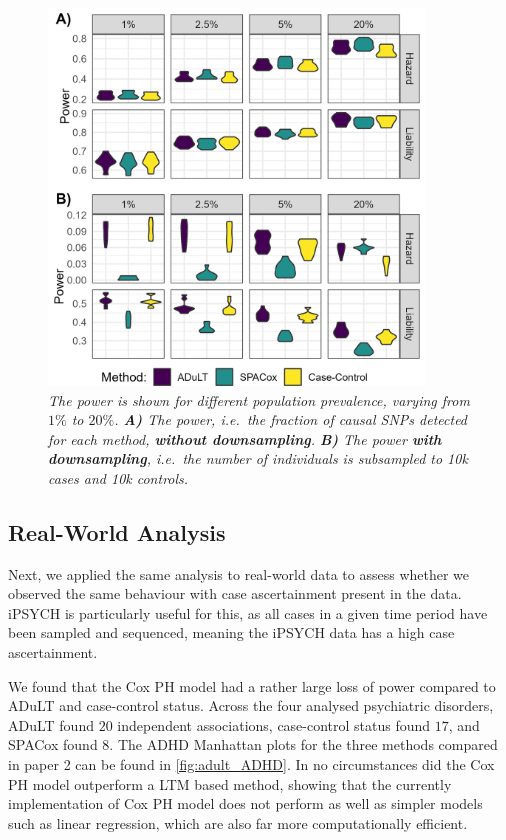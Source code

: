 \begin{figure}[h]
	\centering
	\includegraphics[width=10cm]{results/adult_combined_C250_power}
	\caption[Power simulation results with $ 250 $ causal SNPs under both generative models and varying prevalences.]{\sl The power is shown for different population prevalence, varying from $ 1\% $ to $ 20\% $. \textbf{A)} The power, i.e.\ the fraction of causal SNPs detected for each method, \textbf{without downsampling}. \textbf{B)} The power \textbf{with downsampling}, i.e.\ the number of individuals is subsampled to 10k cases and 10k controls.}
	\label{fig:adult_simulations}
\end{figure}


\subsection{Real-World Analysis}
Next, we applied the same analysis to real-world data to assess whether we observed the same behaviour with case ascertainment present in the data. iPSYCH is particularly useful for this, as all cases in a given time period have been sampled and sequenced, meaning the iPSYCH data has a high case ascertainment.

We found that the Cox PH model had a rather large loss of power compared to ADuLT and case-control status. Across the four analysed psychiatric disorders, ADuLT found $ 20 $ independent associations, case-control status found $ 17 $, and SPACox found $ 8 $. The ADHD Manhattan plots for the three methods compared in paper 2 can be found in \cref{fig:adult_ADHD}. In no circumstances did the Cox PH model outperform a LTM based method, showing that the currently implementation of Cox PH model does not perform as well as simpler models such as linear regression, which are also far more computationally efficient.

